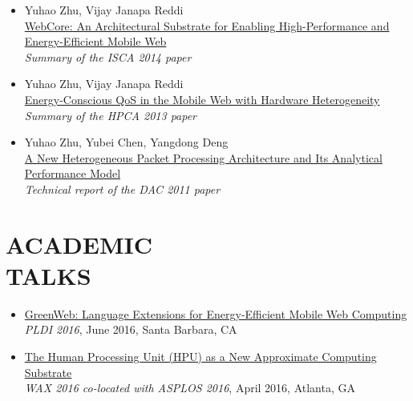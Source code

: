 \documentclass[margin, 9pt]{res} %
\begin{document}
\begin{resume}
\begin{itemize}[leftmargin=*]
	\item Yuhao Zhu, Vijay Janapa Reddi\\
          \href{http://yuhaozhu.com/pubs/isca14-summary.pdf}{WebCore: An Architectural Substrate for Enabling High-Performance and Energy-Efficient Mobile Web
}\\
          \textit{Summary of the ISCA 2014 paper}

	\item Yuhao Zhu, Vijay Janapa Reddi\\
          \href{http://yuhaozhu.com/pubs/hpca13-summary.pdf}{Energy-Conscious QoS in the Mobile Web with Hardware Heterogeneity}\\
          \textit{Summary of the HPCA 2013 paper}

	\item Yuhao Zhu, Yubei Chen, Yangdong Deng\\
          \href{http://yuhaozhu.com/pubs/tr12.pdf}{A New Heterogeneous Packet Processing Architecture and Its Analytical Performance Model}\\
          \textit{Technical report of the DAC 2011 paper}
\end{itemize}

 
\section{ACADEMIC\\ TALKS}

\vspace*{-2pt}
\begin{itemize}[leftmargin=*] \itemsep 0pt
	\item \href{https://speakerdeck.com/queeten/greenweb-language-extensions-for-energy-efficient-mobile-web-computing}{GreenWeb: Language Extensions for Energy-Efficient Mobile Web Computing}\\[2pt]
          \textit{PLDI 2016}, June 2016, Santa Barbara, CA

	\item \href{https://speakerdeck.com/queeten/the-human-processing-unit-hpu-as-a-new-approximate-computing-substrate}{The Human Processing Unit (HPU) as a New Approximate Computing Substrate}\\[2pt]
          \textit{WAX 2016 co-located with ASPLOS 2016}, April 2016, Atlanta, GA


\end{itemize}
\end{resume}
\end{document}
